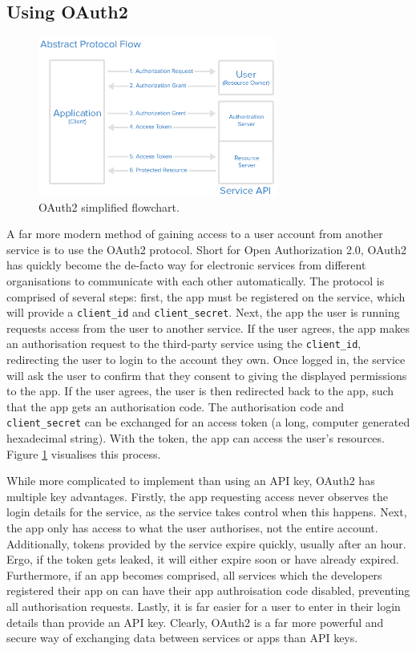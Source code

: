 \documentclass[11pt]{article}
\begin{document}
\subsection{Using OAuth2}

\begin{figure}[b!]
    \centering
    \includegraphics[width=0.7\textwidth]{figures/oauth_abstract_flow.png}
    \caption{OAuth2 simplified flowchart.}
    \label{fig:oauth-flowchart}
\end{figure}

A far more modern method of gaining access to a user account from another service is to use the OAuth2 protocol. Short for Open Authorization 2.0, OAuth2 has quickly become the de-facto way for electronic services from different organisations to communicate with each other automatically. The protocol is comprised of several steps: first, the app must be registered on the service, which will provide a \texttt{client\_id} and \texttt{client\_secret}. Next, the app the user is running requests access from the user to another service. If the user agrees, the app makes an authorisation request to the third-party service using the \texttt{client\_id}, redirecting the user to login to the account they own. Once logged in, the service will ask the user to confirm that they consent to giving the displayed permissions to the app. If the user agrees, the user is then redirected back to the app, such that the app gets an authorisation code. The authorisation code and \texttt{client\_secret} can be exchanged for an access token (a long, computer generated hexadecimal string). With the token, the app can access the user's resources. Figure \ref{fig:oauth-flowchart} visualises this process.

While more complicated to implement than using an API key, OAuth2 has multiple key advantages. Firstly, the app requesting access never observes the login details for the service, as the service takes control when this happens. Next, the app only has access to what the user authorises, not the entire account. Additionally, tokens provided by the service expire quickly, usually after an hour. Ergo, if the token gets leaked, it will either expire soon or have already expired. Furthermore, if an app becomes comprised, all services which the developers registered their app on can have their app authroisation code disabled, preventing all authorisation requests. Lastly, it is far easier for a user to enter in their login details than provide an API key. Clearly, OAuth2 is a far more powerful and secure way of exchanging data between services or apps than API keys.
\end{document}

